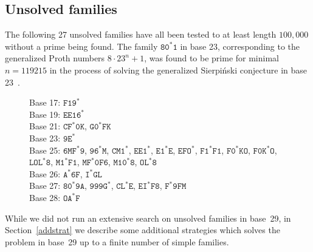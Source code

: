 \documentclass[12pt]{article}
\theoremstyle{plain}
\theoremstyle{definition}
\theoremstyle{remark}
\newcommand{\0}{\mathtt{0}}
\newcommand{\1}{\mathtt{1}}
\newcommand{\2}{\mathtt{2}}
\newcommand{\3}{\mathtt{3}}
\newcommand{\4}{\mathtt{4}}
\newcommand{\5}{\mathtt{5}}
\newcommand{\6}{\mathtt{6}}
\newcommand{\7}{\mathtt{7}}
\newcommand{\8}{\mathtt{8}}
\newcommand{\9}{\mathtt{9}}
\begin{document}
\subsection{Unsolved families}

The following 27 unsolved families have all been tested to at least length $100{,}000$ without
a prime being found.
The family $\8\0^*\1$ in base 23, corresponding to the
generalized Proth numbers $8\cdot23^n+1$, was found to be prime
for minimal $n=119215$ in the process
of solving the generalized Sierpi\'nski conjecture in base 23~\cite{crus}.

\begin{figure}[H]
Base 17: $\mathtt{F19^*}$ \\
Base 19: $\mathtt{EE16^*}$ \\
Base 21: $\mathtt{CF^*0K}$, $\mathtt{G0^*FK}$ \\
Base 23: $\mathtt{9E^*}$ \\
Base 25: $\mathtt{6MF^*9}$, $\mathtt{96^*M}$, $\mathtt{CM1^*}$, $\mathtt{EE1^*}$, $\mathtt{E1^*E}$, $\mathtt{EFO^*}$, $\mathtt{F1^*F1}$, $\mathtt{F0^*KO}$, $\mathtt{F0K^*O}$, $\mathtt{LOL^*8}$, $\mathtt{M1^*F1}$, $\mathtt{MF^*0F6}$, $\mathtt{M10^*8}$, $\mathtt{OL^*8}$ \\
Base 26: $\mathtt{A^*6F}$, $\mathtt{I^*GL}$ \\
Base 27: $\mathtt{80^*9A}$, $\mathtt{999G^*}$, $\mathtt{CL^*E}$, $\mathtt{EI^*F8}$, $\mathtt{F^*9FM}$ \\
Base 28: $\mathtt{OA^*F}$
\end{figure}

While we did not run an extensive search on unsolved families in base~29, in
Section~\ref{addstrat} we describe some additional strategies which solves
the problem in base~29 up to a finite number of simple families.
\end{document}
